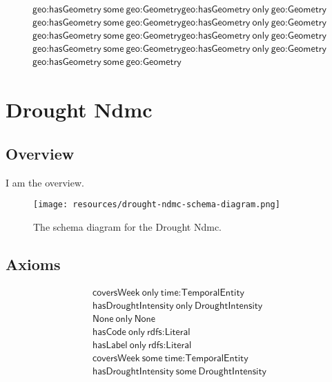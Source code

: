\begin{align}
  \textsf{geo:hasGeometry}~\textsf{some}~\textsf{geo:Geometry}  \textsf{geo:hasGeometry}~\textsf{only}~\textsf{geo:Geometry}\\
  \textsf{geo:hasGeometry}~\textsf{some}~\textsf{geo:Geometry}  \textsf{geo:hasGeometry}~\textsf{only}~\textsf{geo:Geometry}\\
  \textsf{geo:hasGeometry}~\textsf{some}~\textsf{geo:Geometry}  \textsf{geo:hasGeometry}~\textsf{only}~\textsf{geo:Geometry}\\
  \textsf{geo:hasGeometry}~\textsf{some}~\textsf{geo:Geometry}  \textsf{geo:hasGeometry}~\textsf{only}~\textsf{geo:Geometry}\\
  \textsf{geo:hasGeometry}~\textsf{some}~\textsf{geo:Geometry}\end{align}



\section{Drought Ndmc}
\label{sec:drought-ndmc}
\subsection{Overview}
\label{ssec:overview}

I am the overview.

\begin{figure}[h!]
  \begin{center}
    \texttt{[image: resources/drought-ndmc-schema-diagram.png]}
  \end{center}
  \caption{The schema diagram for the Drought Ndmc.}
  \label{fig:ov-diagram}
\end{figure}


\subsection{Axioms}
\begin{align}
  \textsf{coversWeek}~\textsf{only}~\textsf{time:TemporalEntity}\\
  \textsf{hasDroughtIntensity}~\textsf{only}~\textsf{DroughtIntensity}\\
  \textsf{None}~\textsf{only}~\textsf{None}\\
  \textsf{hasCode}~\textsf{only}~\textsf{rdfs:Literal}\\
  \textsf{hasLabel}~\textsf{only}~\textsf{rdfs:Literal}\\
  \textsf{coversWeek}~\textsf{some}~\textsf{time:TemporalEntity}\\
  \textsf{hasDroughtIntensity}~\textsf{some}~\textsf{DroughtIntensity}\end{align}


